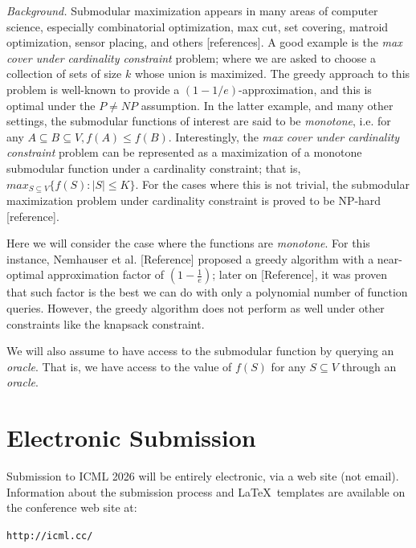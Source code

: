 \documentclass{article}
\theoremstyle{plain}
\theoremstyle{definition}
\theoremstyle{remark}
\begin{document}
\emph{Background.} Submodular maximization appears in many areas of computer science, especially combinatorial optimization, max cut, set covering, matroid optimization, sensor placing, and others [references]. A good example is the \emph{max cover under cardinality constraint} problem; where we are asked to choose a collection of sets of size $k$ whose union is maximized. The greedy approach to this problem is well-known to provide a $(1-1/e)$-approximation, and this is optimal under the $P \neq NP$ assumption. In the latter example, and many other settings, the submodular functions of interest are said to be \emph{monotone}, i.e. for any $A\subseteq B \subseteq V, f(A) \leq f(B)$. Interestingly, the \emph{max cover under cardinality constraint} problem can be represented as a maximization of a monotone submodular function under a cardinality constraint; that is, $max_{S \subseteq V} \{f(S) : |S| \leq K\}$. For the cases where this is not trivial, the submodular maximization problem under cardinality constraint is proved to be NP-hard [reference]. 

Here we will consider the case where the functions are \emph{monotone}. For this instance, Nemhauser et al. [Reference] proposed a greedy algorithm with a near-optimal approximation factor of $(1 -\frac{1}{e})$; later on [Reference], it was proven that such factor is the best we can do with only a polynomial number of function queries. However, the greedy algorithm does not perform as well under other constraints like the knapsack constraint.

We will also assume to have access to the submodular function by querying an \emph{oracle}. That is, we have access to the value of $f(S)$ for any $S \subseteq V$ through an \emph{oracle}.

\section{Electronic Submission}

Submission to ICML 2026 will be entirely electronic, via a web site
(not email). Information about the submission process and \LaTeX\ templates
are available on the conference web site at:
\begin{center}
  \texttt{http://icml.cc/}
\end{center}
\end{document}
